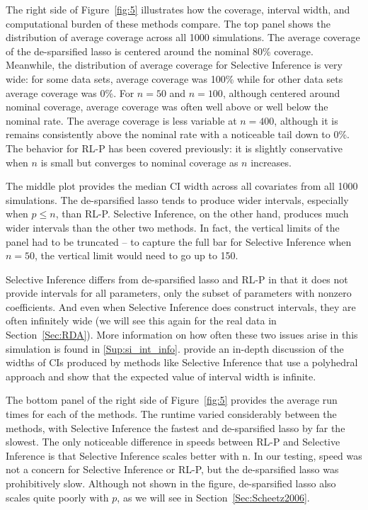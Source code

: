 The right side of Figure~\ref{fig:5} illustrates how the coverage, interval width, and computational burden of these methods compare. The top panel shows the distribution of average coverage across all 1000 simulations. The average coverage of the de-sparsified lasso is centered around the nominal 80\% coverage. Meanwhile, the distribution of average coverage for Selective Inference is very wide: for some data sets, average coverage was 100\% while for other data sets average coverage was 0\%. For $n = 50$ and $n = 100$, although centered around nominal coverage, average coverage was often well above or well below the nominal rate. The average coverage is less variable at $n = 400$, although it is remains consistently above the nominal rate with a noticeable tail down to 0\%. The behavior for RL-P has been covered previously: it is slightly conservative when $n$ is small but converges to nominal coverage as $n$ increases.

The middle plot provides the median CI width across all covariates from all 1000 simulations. The de-sparsified lasso tends to produce wider intervals, especially when $p \le n$, than RL-P. Selective Inference, on the other hand, produces much wider intervals than the other two methods. In fact, the vertical limits of the panel had to be truncated -- to capture the full bar for Selective Inference when $n = 50$, the vertical limit would need to go up to 150.

Selective Inference differs from de-sparsified lasso and RL-P in that it does not provide intervals for all parameters, only the subset of parameters with nonzero coefficients. And even when Selective Inference does construct intervals, they are often infinitely wide (we will see this again for the real data in Section~\ref{Sec:RDA}). More information on how often these two issues arise in this simulation is found in \ref{Sup:si_int_info}. \citet{Kivaranovic2021} provide an in-depth discussion of the widths of CIs produced by methods like Selective Inference that use a polyhedral approach and show that the expected value of interval width is infinite.

The bottom panel of the right side of Figure~\ref{fig:5} provides the average run times for each of the methods. The runtime varied considerably between the methods, with Selective Inference the fastest and de-sparsified lasso by far the slowest.  The only noticeable difference in speeds between RL-P and Selective Inference is that Selective Inference scales better with n. In our testing, speed was not a concern for Selective Inference or RL-P, but the de-sparsified lasso was prohibitively slow. Although not shown in the figure, de-sparsified lasso also scales quite poorly with $p$, as we will see in Section~\ref{Sec:Scheetz2006}.

